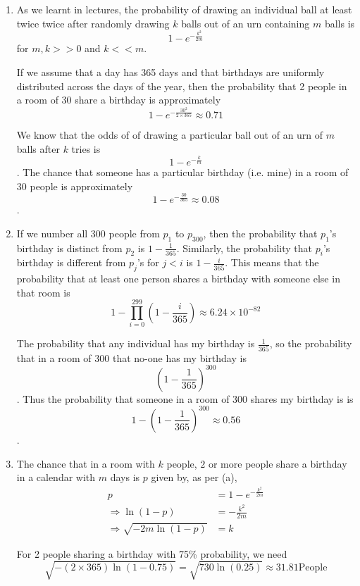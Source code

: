 \begin{enumerate}
\item 
As we learnt in lectures\cite{Slides_43}, the probability of drawing an
individual ball at least twice twice after randomly drawing $k$ balls out of an
urn containing $m$ balls is \[1 - e^{-\frac{k^2}{2m}}\] for $m,k >> 0$
and $k << m$. 

If we assume that a day has 365 days and that birthdays are uniformly
distributed across the days of the year, then the probability that
2 people in a room of 30 share a birthday is approximately 
\[1 - e^{-\frac{30^2}{2 \times 365}} \approx 0.71 \]

We know that the odds of of drawing a particular ball out of an urn of $m$ balls
after $k$ tries 
 is \[1-e^{-\frac{k}{m}}\]\cite{Slides_36}. The chance that someone has a
 particular birthday (i.e. mine) in a room of 30 people is approximately \[1 -
 e^{-\frac{30}{365}} \approx 0.08\].

\item

If we number all 300 people from $p_1$ to $p_{300}$, then the probability that
$p_1$'s birthday is distinct from $p_2$ is $1-\frac{1}{365}$. Similarly, the
probability that $p_i$'s birthday is different from $p_j$'s for $j < i$ is $1 -
\frac{i}{365}$. This means that the probability that at least one person shares
a birthday with someone else in that room is 
\[1 - \prod^{299}_{i=0} \left(1 - \frac{i}{365} \right) \approx
6.24 \times 10^{-82}\]

The probability that any individual has my birthday is $\frac{1}{365}$, so the
probability that in a room of 300 that no-one has my birthday is \[\left(1 -
\frac{1}{365} \right)^{300}\]. Thus the probability that someone in a room of 300
shares my birthday is is \[1- \left(1 - \frac{1}{365} \right)^{300} \approx
0.56\].

\item
The chance that in a room with $k$ people, $2$ or more people share a birthday
in a calendar with $m$ days is $p$ given by, as per (a),
\begin{align*}
p &=1 - e^{-\frac{k^2}{2m}} \\
\Rightarrow \ln(1-p) &= - \frac{k^2}{2m} \\
\Rightarrow \sqrt{-2m\ln(1-p)} &= k
\end{align*}

For 2 people sharing a birthday with 75\% probability, we need
\[\sqrt{-(2 \times 365)\ln(1-0.75)} = \sqrt{730\ln(0.25)} \approx 31.81 \text{
People}\] 


\end{enumerate}
